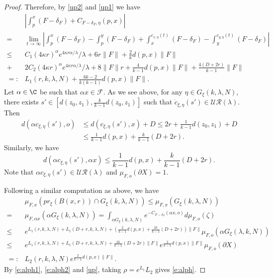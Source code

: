\documentclass[11pt]{amsart}
\theoremstyle{definition}
\newcommand{\F}{\mathcal{F}}
\newcommand{\UR}{\mathcal{UR}}
\def\pX{{\partial X}}
\def\a{\alpha}
\def\d{\delta}   %
\def\l{\lambda}   \def\L{\Lambda}
\begin{document}
\begin{proof}
Therefore, by \eqref{up2} and \eqref{up1} we have
\begin{equation}\label{e:alph2}
\begin{aligned}
&\left|\int_p^x (F-\d_F)+C_{F-\d_F,\eta}(p,x)\right|\\
=&\lim_{t\to \infty}\left|\int_p^x(F-\d_F)-\int_p^y(F-\d_F)+\int_x^{c_{x,\eta}(t)}(F-\d_F)-\int_y^{c_{y,\eta}(t)}(F-\d_F)\right|\\
\le &C_1(4\kappa r)^\a e^{4\kappa r\a/\lambda}/\l+6r\|F\|+\frac{2}{k}d(p,x)\|F\|\\
+&2C_2(4\kappa r)^\a e^{4\kappa r\a/\lambda}/\l+8\|F\|r+\frac{4}{k-1}d(p,x)\|F\|+\frac{4(D+2r)}{k-1}\|F\|\\
=:&L_1(r, k,\l, N)+\frac{6k-2}{k(k-1)}d(p,x)\|F\|.
\end{aligned}
\end{equation}
Let $\a\in \C$ be such that $\a x\in \F$. As we see above, for any $\eta\in G_\xi(k, \l, N)$, there exists $s'\in [d(z_0,z_1), \frac{k}{k-1}d(z_0,z_1)]$ such that $\dot c_{\xi,\eta}(s')\in \UR(\l)$. Then 
\begin{equation*}
\begin{aligned} 
d(\a c_{\xi,\eta}(s'),o)&\le d(c_{\xi,\eta}(s'),x)+D\le 2r+\frac{1}{k-1}d(z_0,z_1)+D\\
&\le \frac{1}{k-1}d(p,x)+\frac{k}{k-1}(D+2r).
 \end{aligned}
\end{equation*}
Similarly, we have
$$d(\a c_{\xi,\eta}(s'),\a x)\le \frac{1}{k-1}d(p,x)+\frac{k}{k-1}(D+2r).$$
Note that $\a c_{\xi,\eta}(s')\in \UR(\l)$ and $\mu_{F,o}(\pX)=1$. 

Following a similar computation as above, we have
\begin{equation}\label{up}
\begin{aligned} 
&\mu_{F,x}(pr_{\xi}(B(x,r))\cap G_\xi(k,\l,N))\le \mu_{F,x}(G_\xi(k,\l,N))\\
=&\mu_{F,\a x}(\a G_\xi(k,\l,N))=\int_{\a G_\xi(k,\l,N)}e^{-C_{F-\d_F}(\a x,o)}d\mu_{F,o}(\zeta)\\
\le & e^{L_1(r,k,\l,N)+L_1(D+r,k,\l,N)+(\frac{2}{k-1}d(p,x)+\frac{2k}{k-1}(D+2r))\|F\|}\mu_{F,o}(\a G_\xi(\l,k,N))\\
\le &e^{ L_1(r,k,\l,N)+L_1(D+r,k,\l,N)+\frac{2k}{k-1}(D+2r)\|F\|}e^{\frac{2}{k-1}d(p,x)\|F\|}\mu_{F,o}(\pX)\\
=: &L_2(r,k,\l,N)e^{\frac{2}{k-1}d(p,x)\|F\|}.   
 \end{aligned}
\end{equation}
By \eqref{e:alph1}, \eqref{e:alph2} and \eqref{up}, taking $\rho=e^{L_1}L_2$ gives \eqref{e:alph}.
\end{proof}
\end{document}
